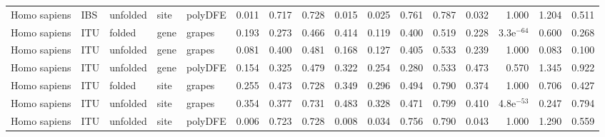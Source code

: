 \begin{longtable}{lllllrrrrrrrrrrr}
        Homo sapiens &                       IBS &  unfolded &  site &  polyDFE &                              0.011 &                               0.717 &                 0.728 &                 0.015 &                              0.025 &                               0.761 &                 0.787 &                 0.032 &         1.000 &  1.204 &  0.511 \\
        Homo sapiens &                       ITU &    folded &  gene &   grapes &                              0.193 &                               0.273 &                 0.466 &                 0.414 &                              0.119 &                               0.400 &                 0.519 &                 0.228 &  3.3e$^{-64}$ &  0.600 &  0.268 \\
        Homo sapiens &                       ITU &  unfolded &  gene &   grapes &                              0.081 &                               0.400 &                 0.481 &                 0.168 &                              0.127 &                               0.405 &                 0.533 &                 0.239 &         1.000 &  0.083 &  0.100 \\
        Homo sapiens &                       ITU &  unfolded &  gene &  polyDFE &                              0.154 &                               0.325 &                 0.479 &                 0.322 &                              0.254 &                               0.280 &                 0.533 &                 0.473 &         0.570 &  1.345 &  0.922 \\
        Homo sapiens &                       ITU &    folded &  site &   grapes &                              0.255 &                               0.473 &                 0.728 &                 0.349 &                              0.296 &                               0.494 &                 0.790 &                 0.374 &         1.000 &  0.706 &  0.427 \\
        Homo sapiens &                       ITU &  unfolded &  site &   grapes &                              0.354 &                               0.377 &                 0.731 &                 0.483 &                              0.328 &                               0.471 &                 0.799 &                 0.410 &  4.8e$^{-53}$ &  0.247 &  0.794 \\
        Homo sapiens &                       ITU &  unfolded &  site &  polyDFE &                              0.006 &                               0.723 &                 0.728 &                 0.008 &                              0.034 &                               0.756 &                 0.790 &                 0.043 &         1.000 &  1.290 &  0.559 \\

\end{longtable}
